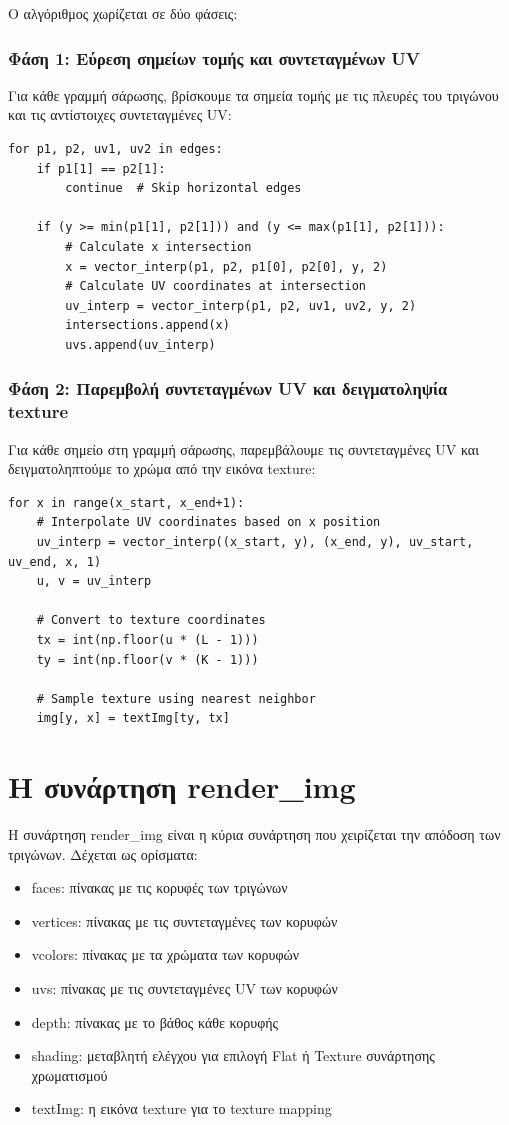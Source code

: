 \documentclass{article}
\begin{document}
Ο αλγόριθμος χωρίζεται σε δύο φάσεις:

\subsubsection{Φάση 1: Εύρεση σημείων τομής και συντεταγμένων UV}
Για κάθε γραμμή σάρωσης, βρίσκουμε τα σημεία τομής με τις πλευρές του τριγώνου και τις αντίστοιχες συντεταγμένες UV:

\begin{lstlisting}
for p1, p2, uv1, uv2 in edges:
    if p1[1] == p2[1]:
        continue  # Skip horizontal edges
        
    if (y >= min(p1[1], p2[1])) and (y <= max(p1[1], p2[1])):
        # Calculate x intersection
        x = vector_interp(p1, p2, p1[0], p2[0], y, 2)
        # Calculate UV coordinates at intersection
        uv_interp = vector_interp(p1, p2, uv1, uv2, y, 2)
        intersections.append(x)
        uvs.append(uv_interp)
\end{lstlisting}

\subsubsection{Φάση 2: Παρεμβολή συντεταγμένων UV και δειγματοληψία texture}
Για κάθε σημείο στη γραμμή σάρωσης, παρεμβάλουμε τις συντεταγμένες UV και δειγματοληπτούμε το χρώμα από την εικόνα texture:

\begin{lstlisting}
for x in range(x_start, x_end+1):
    # Interpolate UV coordinates based on x position
    uv_interp = vector_interp((x_start, y), (x_end, y), uv_start, uv_end, x, 1)
    u, v = uv_interp
    
    # Convert to texture coordinates
    tx = int(np.floor(u * (L - 1)))
    ty = int(np.floor(v * (K - 1)))
    
    # Sample texture using nearest neighbor
    img[y, x] = textImg[ty, tx]
\end{lstlisting}

\section{Η συνάρτηση render\_img}
Η συνάρτηση render\_img είναι η κύρια συνάρτηση που χειρίζεται την απόδοση των τριγώνων. Δέχεται ως ορίσματα:
\begin{itemize}
  \item faces: πίνακας με τις κορυφές των τριγώνων
  \item vertices: πίνακας με τις συντεταγμένες των κορυφών
  \item vcolors: πίνακας με τα χρώματα των κορυφών
  \item uvs: πίνακας με τις συντεταγμένες UV των κορυφών
  \item depth: πίνακας με το βάθος κάθε κορυφής
  \item shading: μεταβλητή ελέγχου για επιλογή Flat ή Texture συνάρτησης χρωματισμού
  \item textImg: η εικόνα texture για το texture mapping
\end{itemize}
\end{document}
